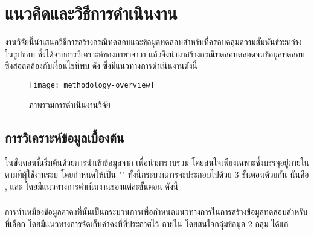 \section{แนวคิดและวิธีการดำเนินงาน}
\label{sec:methodology}

งานวิจัยนี้นำเสนอวิธีการสร้างกรณีทดสอบและข้อมูลทดสอบสำหรับ{\TestPath}ที่ครอบคลุมความสัมพันธ์ระหว่าง{\softwareComponent}ในรูปขอบ{\scg} 
ซึ่งได้จากการวิเคราะห์{\StaticInformation}ของ{\sourcecode}ภาษาจาวา แล้วจึงนำมาสร้างกรณีทดสอบตลอดจนข้อมูลทดสอบซึ่งสอดคล้องกับเงื่อนไขที่พบ
ดัง ซึ่งมีแนวทางการดำเนินงานดังนี้


\begin{figure}[ht!]
    \centering
    \texttt{[image: methodology-overview]}
    \caption{ภาพรวมการดำเนินงานวิจัย}
    \label{fig:methodologyoverview}
\end{figure}

\subsection{การวิเคราะห์ข้อมูลเบื้องต้น}
\label{subs:introsection}

ในขั้นตอนนี้เริ่มต้นด้วยการนำเข้าข้อมูล{\sourcecode}จาก{\Repository} เพื่อนำมารวบรวม{\StaticInformation} 
โดยสนใจเพียงเฉพาะ{\class}ซึ่งบรรจุอยู่ภายใน\FirstTimeDefine{\Package}{\PackageEN} ตามที่ผู้ใช้งานระบุ 
โดยกำหนดให้เป็น "\FirstTimeDefine{\CUT}{\CUTEN}" ทั้งนี้กระบวนการจะประกอบไปด้วย 3 ขั้นตอนด้วยกัน นั่นคือ
\FirstTimeDefine{\constantExtracting}, \FirstTimeDefine{\graphCreation}{\graphCreationEN} 
และ\FirstTimeDefine{\sourcecodeInstrumention}{\sourcecodeInstrumentionEN} 
โดยมีแนวทางการดำเนินงานของแต่ละขั้นตอน ดังนี้

\subsubsection{\constantExtracting}
\label{sec:sub:sub:sourceCodeExtract}

การทำเหมืองข้อมูลค่าคงที่นั้นเป็นกระบวนการเพื่อกำหนดแนวทางการในการสร้างข้อมูลทดสอบสำหรับ{\TestPath}ที่เลือก โดยมีแนวทางการจัดเก็บค่าคงที่ที่ประกาศไว้
ภายใน{\sourcecode} โดยสนใจกลุ่มข้อมูล 2 กลุ่ม ได้แก่

